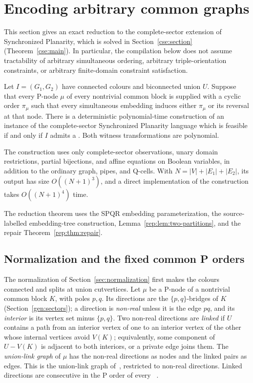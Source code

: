 \section{Encoding arbitrary common graphs}
\label{gen:section}

This section gives an exact reduction to the complete-sector extension
of Synchronized Planarity, which is solved in Section~\ref{cse:section}
(Theorem~\ref{cse:main}). In particular, the
compilation below does not assume tractability of arbitrary simultaneous
ordering, arbitrary triple-orientation constraints, or arbitrary finite-domain
constraint satisfaction.

\begin{theorem}
\label{gen:compilation}
Let $I=(G_1,G_2)$ have connected colours and biconnected union $U$.  Suppose
that every P-node $\mu$ of every nontrivial common block is supplied with a
cyclic order $\pi_\mu$ such that every simultaneous embedding induces either
$\pi_\mu$ or its reversal at that node.  There is a deterministic
polynomial-time construction of an instance of the complete-sector
Synchronized Planarity language which is feasible if and only if $I$ admits
a \SEFE.  Both witness transformations are polynomial.

The construction uses only complete-sector observations, unary domain
restrictions, partial bijections, and affine equations on Boolean variables,
in addition to the ordinary graph, pipes, and Q-cells.  With
$N=|V|+|E_1|+|E_2|$, its output has size $O((N+1)^3)$, and a direct implementation of the construction takes
$O((N+1)^4)$ time.
\end{theorem}

The reduction theorem uses the
SPQR embedding parameterization, the source-labelled embedding-tree
construction, Lemma~\ref{rep:lem:two-partitions}, and the repair
Theorem~\ref{rep:thm:repair}.

\subsection{Normalization and the fixed common P orders}
\label{gen:porders}

The normalization of Section~\ref{sec:normalization} first makes the colours
connected and splits at union cutvertices.  Let $\mu$ be a P-node of a
nontrivial common block $K$, with poles $p,q$.  Its directions are the
$\{p,q\}$-bridges of $K$ (Section~\ref{gen:sectors}); a direction is
\emph{non-real} unless it is the edge $pq$, and its \emph{interior} is its
vertex set minus $\{p,q\}$.  Two non-real directions are \emph{linked} if
$U$ contains a path from an interior vertex of one to an interior vertex of
the other whose internal vertices avoid $V(K)$; equivalently, some
component of $U-V(K)$ is adjacent to both interiors, or a private edge
joins them.  The \emph{union-link graph} of $\mu$ has the non-real
directions as nodes and the linked pairs as edges.  This is the union-link
graph of~\cite{bkr}, restricted to non-real directions.  Linked directions
are consecutive in the P order of every \SEFE{}~\cite[Lemma~2]{bkr}.

